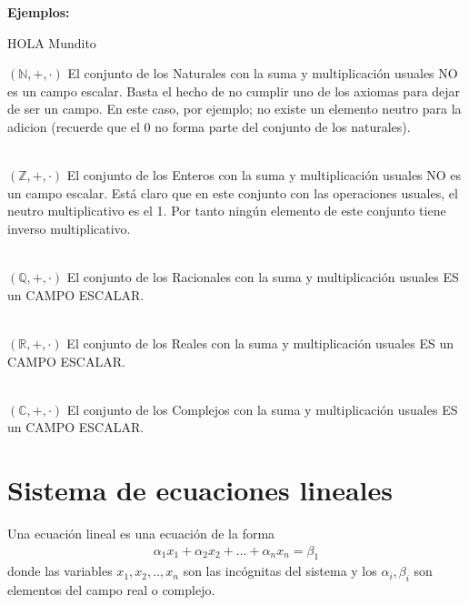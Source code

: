 \textbf{Ejemplos:}


HOLA Mundito

$\left( \mathbb{N},+ ,\cdot \right) $
El conjunto de los Naturales con la suma y multiplicación usuales NO es un campo escalar.
Basta el hecho de no cumplir uno de los axiomas para dejar de ser un campo. En este caso, por ejemplo; no existe un elemento neutro para la adicion (recuerde que el 0 no forma parte del conjunto de los naturales).

~\\
$\left( \mathbb{Z},+ ,\cdot \right) $ 
El conjunto de los Enteros con la suma y multiplicación usuales NO es un campo escalar.
Está claro que en este conjunto con las operaciones usuales, el neutro multiplicativo es el 1. Por tanto ningún elemento de este conjunto tiene inverso multiplicativo.

~\\
$\left( \mathbb{Q},+ ,\cdot \right) $ 
El conjunto de los Racionales con la suma y multiplicación usuales ES un CAMPO ESCALAR.

~\\
$\left( \mathbb{R},+ ,\cdot \right) $ 
El conjunto de los Reales con la suma y multiplicación usuales ES un CAMPO ESCALAR.

~\\
$\left( \mathbb{C},+ ,\cdot \right) $ 
El conjunto de los Complejos con la suma y multiplicación usuales ES un CAMPO ESCALAR.


\section{Sistema de ecuaciones lineales}

Una ecuación lineal es una ecuación de la forma
\begin{align*}
\alpha_1 x_1+\alpha_2 x_2+...+\alpha_n x_n=\beta_1
\end{align*} 
donde las variables $x_1, x_2, .., x_n$ son las incógnitas del sistema y los $\alpha_i, \beta_i$ son elementos del campo real o complejo.

